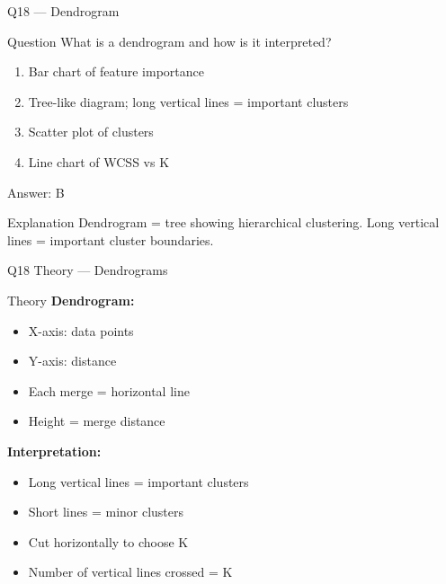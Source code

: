 \documentclass[aspectratio=169,8pt]{beamer}
\begin{document}
	\begin{frame}{Q18 --- Dendrogram}
		\begin{block}{Question}
			What is a dendrogram and how is it interpreted?
		\end{block}
		\begin{enumerate}[label=\Alph*.]
			\item Bar chart of feature importance
			\item Tree-like diagram; long vertical lines = important clusters
			\item Scatter plot of clusters
			\item Line chart of WCSS vs K
		\end{enumerate}
		\begin{exampleblock}{Answer: B}
		\end{exampleblock}
		\begin{block}{Explanation}
			Dendrogram = tree showing hierarchical clustering. Long vertical lines = important cluster boundaries.
		\end{block}
	\end{frame}
	
	\begin{frame}{Q18 Theory --- Dendrograms}
		\begin{block}{Theory}
			\textbf{Dendrogram:}
			\begin{itemize}
				\item X-axis: data points
				\item Y-axis: distance
				\item Each merge = horizontal line
				\item Height = merge distance
			\end{itemize}
			\textbf{Interpretation:}
			\begin{itemize}
				\item Long vertical lines = important clusters
				\item Short lines = minor clusters
				\item Cut horizontally to choose K
				\item Number of vertical lines crossed = K
			\end{itemize}
		\end{block}
	\end{frame}
	
\end{document}
